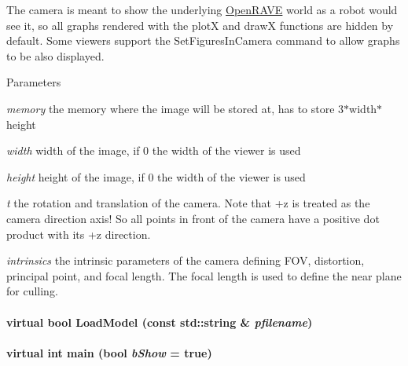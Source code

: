 The camera is meant to show the underlying \hyperlink{namespaceOpenRAVE}{OpenRAVE} world as a robot would see it, so all graphs rendered with the plotX and drawX functions are hidden by default. Some viewers support the SetFiguresInCamera command to allow graphs to be also displayed. 
\begin{DoxyParams}{Parameters}
\item[{\em memory}]the memory where the image will be stored at, has to store 3$\ast$width$\ast$height \item[{\em width}]width of the image, if 0 the width of the viewer is used \item[{\em height}]height of the image, if 0 the width of the viewer is used \item[{\em t}]the rotation and translation of the camera. Note that +z is treated as the camera direction axis! So all points in front of the camera have a positive dot product with its +z direction. \item[{\em intrinsics}]the intrinsic parameters of the camera defining FOV, distortion, principal point, and focal length. The focal length is used to define the near plane for culling. \end{DoxyParams}
\hypertarget{classOpenRAVE_1_1ViewerBase_a4b6920a362f58dfd5113a5163266780d}{
\paragraph[{LoadModel}]{\setlength{\rightskip}{0pt plus 5cm}virtual bool LoadModel (const std::string \& {\em pfilename})}\hfill}
\label{classOpenRAVE_1_1ViewerBase_a4b6920a362f58dfd5113a5163266780d}
\hypertarget{classOpenRAVE_1_1ViewerBase_ada75ea5cccc17a8cf81b638117139c1c}{
\paragraph[{main}]{\setlength{\rightskip}{0pt plus 5cm}virtual int main (bool {\em bShow} = {\ttfamily true})}\hfill}
\label{classOpenRAVE_1_1ViewerBase_ada75ea5cccc17a8cf81b638117139c1c}


